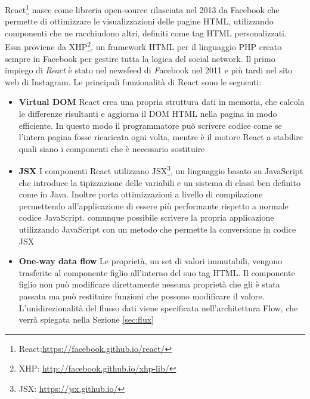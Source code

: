 React\footnote{React:\url{https://facebook.github.io/react/}} nasce come libreria open-source rilasciata nel 2013 da Facebook che permette di ottimizzare le visualizzazioni delle pagine HTML, utilizzando componenti che ne racchiudono altri, definiti come tag HTML personalizzati.
Essa proviene da XHP\footnote{XHP: \url{http://facebook.github.io/xhp-lib/}}, un framework HTML per il linguaggio PHP creato sempre in Facebook per gestire tutta la logica del social network. Il primo impiego di \emph{React} è stato nel newsfeed di \emph Facebook nel 2011 e più tardi nel sito web di Instagram.
Le principali funzionalità di React sono le seguenti:
\begin{itemize}
	\item \textbf{Virtual DOM}
	React crea una propria struttura dati in memoria, che calcola le differenze risultanti e aggiorna il DOM HTML nella pagina in modo efficiente. In questo modo il programmatore può scrivere codice come se l'intera pagina fosse ricaricata ogni volta, mentre è il motore React a stabilire quali siano i componenti che è necessario sostituire
	
	\item \textbf{JSX}
	I componenti React utilizzano JSX\footnote{JSX: \url{https://jsx.github.io/}}, un linguaggio basato su JavaScript che introduce la tipizzazione delle variabili e un sistema di classi ben definito come in Java. Inoltre porta ottimizzazioni a livello di compilazione permettendo all'applicazione di essere più performante rispetto a normale codice JavaScript. \upe comunque possibile scrivere la propria applicazione utilizzando JavaScript con un metodo che permette la conversione in codice JSX
	
	\item \textbf{One-way data flow} Le proprietà, un set di valori immutabili, vengono trasferite al componente figlio all'interno del suo tag HTML. Il componente figlio non può modificare direttamente nessuna proprietà che gli è stata passata ma può restituire funzioni che possono modificare il valore. 
	L'unidirezionalità del flusso dati viene specificata nell'architettura Flow, che verrà spiegata nella Sezione \ref{sec:flux}
\end{itemize}

